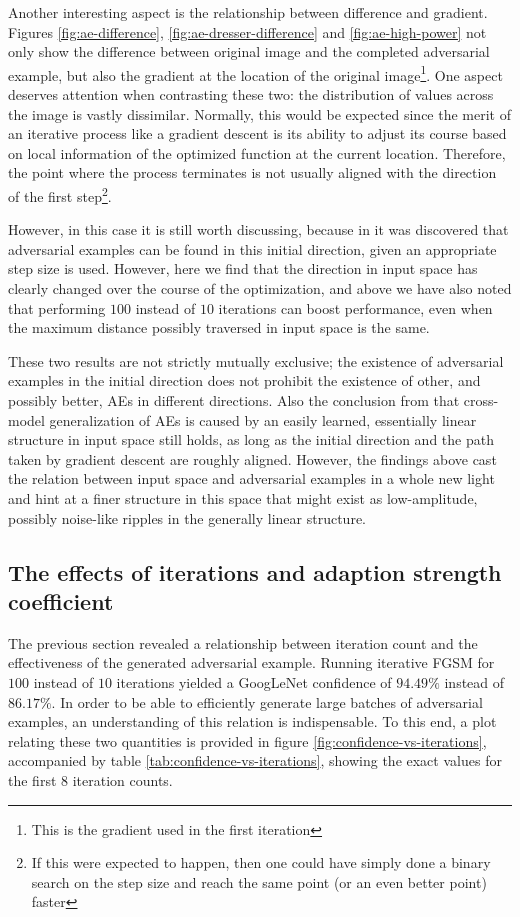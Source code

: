 \documentclass[11pt, a4paper]{article}
\begin{document}
Another interesting aspect is the relationship between difference and gradient. Figures \ref{fig:ae-difference}, \ref{fig:ae-dresser-difference} and \ref{fig:ae-high-power} not only show the difference between original image and the completed adversarial example, but also the gradient at the location of the original image\footnote{This is the gradient used in the first iteration}. One aspect deserves attention when contrasting these two: the distribution of values across the image is vastly dissimilar. Normally, this would be expected since the merit of an iterative process like a gradient descent is its ability to adjust its course based on local information of the optimized function at the current location. Therefore, the point where the process terminates is not usually aligned with the direction of the first step\footnote{If this were expected to happen, then one could have simply done a binary search on the step size and reach the same point (or an even better point) faster}.

However, in this case it is still worth discussing, because in \cite{explaining-and-harnessing-adversarial-examples} it was discovered that adversarial examples can be found in this initial direction, given an appropriate step size is used. However, here we find that the direction in input space has clearly changed over the course of the optimization, and above we have also noted that performing $100$ instead of $10$ iterations can boost performance, even when the maximum distance possibly traversed in input space is the same.

These two results are not strictly mutually exclusive; the existence of adversarial examples in the initial direction does not prohibit the existence of other, and possibly better, AEs in different directions. Also the conclusion from \cite{explaining-and-harnessing-adversarial-examples} that cross-model generalization of AEs is caused by an easily learned, essentially linear structure in input space still holds, as long as the initial direction and the path taken by gradient descent are roughly aligned. However, the findings above cast the relation between input space and adversarial examples in a whole new light and hint at a finer structure in this space that might exist as low-amplitude, possibly noise-like ripples in the generally linear structure.

\subsection{The effects of iterations and adaption strength coefficient}
The previous section revealed a relationship between iteration count and the effectiveness of the generated adversarial example. Running iterative FGSM for $100$ instead of $10$ iterations yielded a GoogLeNet confidence of $94.49\%$ instead of $86.17\%$. In order to be able to efficiently generate large batches of adversarial examples, an understanding of this relation is indispensable. To this end, a plot relating these two quantities is provided in figure \ref{fig:confidence-vs-iterations}, accompanied by table \ref{tab:confidence-vs-iterations}, showing the exact values for the first 8 iteration counts.
\end{document}
